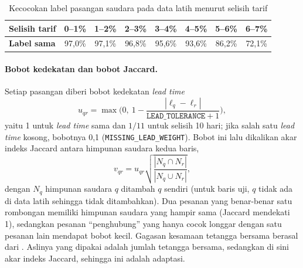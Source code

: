 \begin{table}[H]
	\centering
	\caption{Kecocokan label pasangan saudara pada data latih menurut selisih tarif}
	\label{tab:svm-bukti-harga}
	\small
	\begin{tabular}{l c c c c c c c}
		\toprule
		\textbf{Selisih tarif} & 0--1\% & 1--2\% & 2--3\% & 3--4\% & 4--5\% & 5--6\% & 6--7\% \\
		\midrule
		\textbf{Label sama} & 97,0\% & 97,1\% & 96,8\% & 95,6\% & 93,6\% & 86,2\% & 72,1\% \\
		\bottomrule
	\end{tabular}
\end{table}

\paragraph{Bobot kedekatan dan bobot Jaccard.} Setiap pasangan diberi bobot kedekatan \textit{lead time}
\begin{equation}
	u_{qr} = \max\Big(0,\ 1 - \frac{|\ell_q - \ell_r|}{\texttt{LEAD\_TOLERANCE} + 1}\Big),
\end{equation}
yaitu 1 untuk \textit{lead time} sama dan $1/11$ untuk selisih 10 hari; jika salah satu \textit{lead time} kosong, bobotnya 0,1 (\texttt{MISSING\_LEAD\_WEIGHT}). Bobot ini lalu dikalikan akar indeks Jaccard antara himpunan saudara kedua baris,
\begin{equation}
	v_{qr} = u_{qr}\sqrt{\frac{|N_q \cap N_r|}{|N_q \cup N_r|}},
\end{equation}
dengan $N_q$ himpunan saudara $q$ ditambah $q$ sendiri (untuk baris uji, $q$ tidak ada di data latih sehingga tidak ditambahkan). Dua pesanan yang benar-benar satu rombongan memiliki himpunan saudara yang hampir sama (Jaccard mendekati 1), sedangkan pesanan ``penghubung'' yang hanya cocok longgar dengan satu pesanan lain mendapat bobot kecil. Gagasan kesamaan tetangga bersama berasal dari \cite{jarvis1973snn}. Aslinya yang dipakai adalah jumlah tetangga bersama, sedangkan di sini akar indeks Jaccard, sehingga ini adalah adaptasi.

